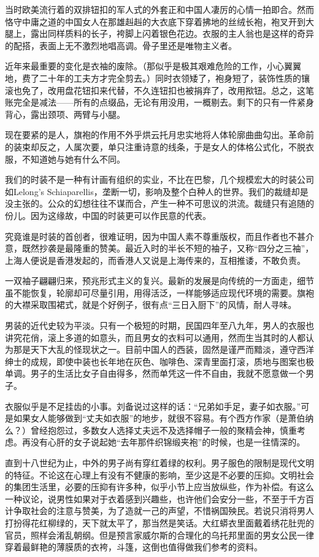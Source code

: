 \par 当时欧美流行着的双排钮扣的军人式的外套正和中国人凄厉的心情一拍即合。然而恪守中庸之道的中国女人在那雄赳赳的大衣底下穿着拂地的丝绒长袍，袍叉开到大腿上，露出同样质料的长子，袴脚上闪着银色花边。衣服的主人翁也是这样的奇异的配搭，表面上无不激烈地唱高调。骨子里还是唯物主义者。
\par 近年来最重要的变化是衣袖的废除。（那似乎是极其艰难危险的工作，小心翼翼地，费了二十年的工夫方才完全剪去。）同时衣领矮了，袍身短了，装饰性质的镶滚也免了，改用盘花钮扣来代替，不久连钮扣也被捐弃了，改用揿钮。总之，这笔账完全是减法——所有的点缀品，无论有用没用，一概剔去。剩下的只有一件紧身背心，露出颈项、两臂与小腿。
\par 现在要紧的是人，旗袍的作用不外乎烘云托月忠实地将人体轮廓曲曲勾出。革命前的装束却反之，人属次要，单只注重诗意的线条，于是女人的体格公式化，不脱衣服，不知道她与她有什么不同。
\par 我们的时装不是一种有计画有组织的实业，不比在巴黎，几个规模宏大的时装公司如Lelong's Schiaparellis，垄断一切，影响及整个白种人的世界。我们的裁缝却是没主张的。公众的幻想往往不谋而合，产生一种不可思议的洪流。裁缝只有追随的份儿。因为这缘故，中国的时装更可以作民意的代表。
\par 究竟谁是时装的首创者，很难证明，因为中国人素不尊重版权，而且作者也不甚介意，既然抄袭是最隆重的赞美。最近入时的半长不短的袖子，又称“四分之三袖”，上海人便说是香港发起的，而香港人又说是上海传来的，互相推诿，不敢负责。
\par 一双袖子翩翩归来，预兆形式主义的复兴。最新的发展是向传统的一方面走，细节虽不能恢复，轮廓却可尽量引用，用得活泛，一样能够适应现代环境的需要。旗袍的大襟采取围裙式，就是个好例子，很有点“三日入厨下”的风情，耐人寻味。
\par 男装的近代史较为平淡。只有一个极短的时期，民国四年至八九年，男人的衣服也讲究花俏，滚上多道的如意头，而且男女的衣料可以通用，然而生当其时的人都认为那是天下大乱的怪现状之一。目前中国人的西装，固然是谨严而黯淡，遵守西洋绅士的成规，即使中装也长年地在灰色、咖啡色、深青里面打滚，质地与图案也极单调。男子的生活比女子自由得多，然而单凭这一件不自由，我就不愿意做一个男子。
\par 衣服似乎是不足挂齿的小事。刘备说过这样的话：“兄弟如手足，妻子如衣服。”可是如果女人能够做到“丈夫如衣服”的地步，就很不容易。有个西方作家（是萧伯纳么？）曾经抱怨过，多数女人选择丈夫远不及选择帽子一般的聚精会神，慎重考虑。再没有心肝的女子说起她“去年那件织锦缎夹袍”的时候，也是一往情深的。
\par 直到十八世纪为止，中外的男子尚有穿红着绿的权利。男子服色的限制是现代文明的特征。不论这在心理上有没有不健康的影响，至少这是不必要的压抑。文明社会的集团生活里，必要的压抑有许多种，似乎小节上应当放纵些，作为补偿。有这么一种议论，说男性如果对于衣着感到兴趣些，也许他们会安分一些，不至于千方百计争取社会的注意与赞美，为了造就一己的声望，不惜祸国殃民。若说只消将男人打扮得花红柳绿的，天下就太平了，那当然是笑话。大红蟒衣里面戴着绣花肚兜的官员，照样会淆乱朝纲。但是预言家威尔斯的合理化的乌托邦里面的男女公民一律穿着最鲜艳的薄膜质的衣袴，斗篷，这倒也值得做我们参考的资料。
